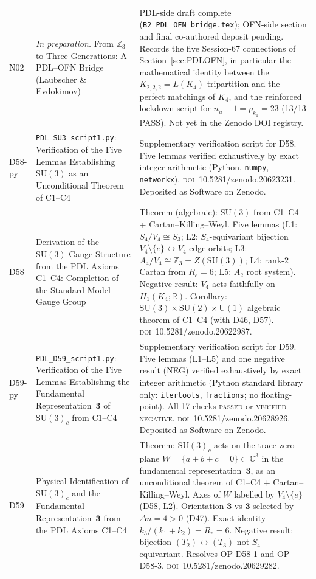 \documentclass[11pt,a4paper]{article}
\theoremstyle{plain}
\theoremstyle{definition}
\theoremstyle{remark}
\begin{document}
\begin{longtable}{L{1.3cm}L{3.8cm}L{8.0cm}}
N02 & \textit{In preparation.} From $\mathbb{Z}_3$ to Three Generations: A PDL--OFN Bridge (Laubscher \& Evdokimov)~\cite{N02} & PDL-side draft complete (\texttt{B2\_PDL\_OFN\_bridge.tex}); OFN-side section and final co-authored deposit pending. Records the five Session-67 connections of Section~\ref{sec:PDLOFN}, in particular the mathematical identity between the $K_{2,2,2}=L(K_4)$ tripartition and the perfect matchings of $K_4$, and the reinforced lockdown script for $n_u-1=p_{k_1}=23$ (13/13 PASS). Not yet in the Zenodo DOI registry.\\[0.4em]
D58-py & \texttt{PDL\_SU3\_script1.py}: Verification of the Five Lemmas Establishing $\mathrm{SU}(3)$ as an Unconditional Theorem of C1--C4~\cite{D58py} & Supplementary verification script for D58. Five lemmas verified exhaustively by exact integer arithmetic (Python, \texttt{numpy}, \texttt{networkx}). \textsc{doi}~10.5281/zenodo.20623231. Deposited as Software on Zenodo.\\[0.4em]
D58 & Derivation of the $\mathrm{SU}(3)$ Gauge Structure from the PDL Axioms C1--C4: Completion of the Standard Model Gauge Group~\cite{D58} & \textcolor{proofblue}{Theorem} (algebraic): $\mathrm{SU}(3)$ from C1--C4 + Cartan--Killing--Weyl. Five lemmas (L1: $S_4/V_4\cong S_3$; L2: $S_4$-equivariant bijection $V_4\setminus\{e\}\leftrightarrow V_4$-edge-orbits; L3: $A_4/V_4\cong\mathbb{Z}_3 = Z(\mathrm{SU}(3))$; L4: rank-2 Cartan from $R_e=6$; L5: $A_2$ root system). Negative result: $V_4$ acts faithfully on $H_1(K_4;\mathbb{R})$. Corollary: $\mathrm{SU}(3)\times\mathrm{SU}(2)\times\mathrm{U}(1)$ algebraic theorem of C1--C4 (with D46, D57). \textsc{doi}~10.5281/zenodo.20622987.\\[0.4em]
D59-py & \texttt{PDL\_D59\_script1.py}: Verification of the Five Lemmas Establishing the Fundamental Representation~$\mathbf{3}$ of $\mathrm{SU}(3)_c$ from C1--C4~\cite{D59py} & Supplementary verification script for D59. Five lemmas (L1--L5) and one negative result (NEG) verified exhaustively by exact integer arithmetic (Python standard library only: \texttt{itertools}, \texttt{fractions}; no floating-point). All 17 checks \textsc{passed} or \textsc{verified negative}. \textsc{doi}~10.5281/zenodo.20628926. Deposited as Software on Zenodo.\\[0.4em]
D59 & Physical Identification of $\mathrm{SU}(3)_c$ and the Fundamental Representation~$\mathbf{3}$ from the PDL Axioms C1--C4~\cite{D59} & \textcolor{proofblue}{Theorem}: $\mathrm{SU}(3)_c$ acts on the trace-zero plane $W = \{a+b+c=0\}\subset\mathbb{C}^3$ in the fundamental representation~$\mathbf{3}$, as an unconditional theorem of C1--C4 + Cartan--Killing--Weyl. Axes of $W$ labelled by $V_4\setminus\{e\}$ (D58, L2). Orientation $\mathbf{3}$ vs $\bar{\mathbf{3}}$ selected by $\Delta n = 4 > 0$ (D47). Exact identity $k_3/(k_1+k_2) = R_e = 6$. Negative result: bijection $(T_2)\leftrightarrow(T_3)$ not $S_4$-equivariant. Resolves OP-D58-1 and OP-D58-3. \textsc{doi}~10.5281/zenodo.20629282.\\[0.4em]

\end{longtable}
\end{document}
